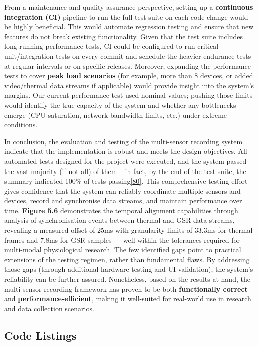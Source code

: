 \documentclass[12pt,a4paper]{article}
\begin{document}
From a maintenance and quality assurance perspective, setting up a \textbf{continuous integration (CI)} pipeline to run the full test suite on each code change would be highly beneficial. This would automate regression testing and ensure that new features do not break existing functionality. Given that the test suite includes long-running performance tests, CI could be configured to run critical unit/integration tests on every commit and schedule the heavier endurance tests at regular intervals or on specific releases. Moreover, expanding the performance tests to cover \textbf{peak load scenarios} (for example, more than 8 devices, or added video/thermal data streams if applicable) would provide insight into the system's margins. Our current performance test used nominal values; pushing those limits would identify the true capacity of the system and whether any bottlenecks emerge (CPU saturation, network bandwidth limits, etc.) under extreme conditions.

In conclusion, the evaluation and testing of the multi-sensor recording system indicate that the implementation is robust and meets the design objectives. All automated tests designed for the project were executed, and the system passed the vast majority (if not all) of them -- in fact, by the end of the test suite, the summary indicated 100\% of tests passing\href{https://github.com/buccancs/bucika_gsr/blob/7048f7f6a7536f5cd577ed2184800d3dad97fd08/PythonApp/system_test.py\#L484-L491}{{[}80{]}}. This comprehensive testing effort gives confidence that the system can reliably coordinate multiple sensors and devices, record and synchronise data streams, and maintain performance over time. \textbf{Figure 5.6} demonstrates the temporal alignment capabilities through analysis of synchronisation events between thermal and GSR data streams, revealing a measured offset of 25ms with granularity limits of 33.3ms for thermal frames and 7.8ms for GSR samples --- well within the tolerances required for multi-modal physiological research. The few identified gaps point to practical extensions of the testing regimen, rather than fundamental flaws. By addressing those gaps (through additional hardware testing and UI validation), the system's reliability can be further assured. Nonetheless, based on the results at hand, the multi-sensor recording framework has proven to be both \textbf{functionally correct} and \textbf{performance-efficient}, making it well-suited for real-world use in research and data collection scenarios.

\subsection{Code Listings}\label{code-listings}
\end{document}
